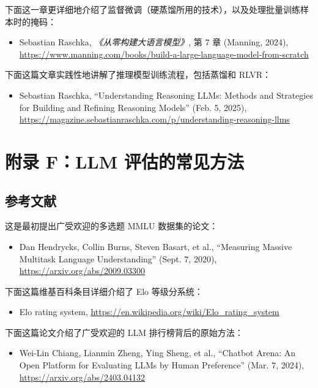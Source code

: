 下面这一章更详细地介绍了监督微调（硬蒸馏所用的技术），以及处理批量训练样本时的掩码：

\begin{itemize}
\item Sebastian Raschka, \emph{《从零构建大语言模型》}, 第 7 章 (Manning, 2024), \href{https://www.manning.com/books/build-a-large-language-model-from-scratch}{https://www.manning.com/books/build-a-large-language-model-from-scratch}
\end{itemize}

下面这篇文章实践性地讲解了推理模型训练流程，包括蒸馏和 RLVR：

\begin{itemize}
\item Sebastian Raschka, “Understanding Reasoning LLMs: Methods and Strategies for Building and Refining Reasoning Models” (Feb. 5, 2025), \href{https://magazine.sebastianraschka.com/p/understanding-reasoning-llms}{https://magazine.sebastianraschka.com/p/understanding-reasoning-llms}
\end{itemize}

\section{附录 F：LLM 评估的常见方法}

\subsection{参考文献}

这是最初提出广受欢迎的多选题 MMLU 数据集的论文：

\begin{itemize}
\item Dan Hendrycks, Collin Burns, Steven Basart, et al., “Measuring Massive Multitask Language Understanding” (Sept. 7, 2020), \href{https://arxiv.org/abs/2009.03300}{https://arxiv.org/abs/2009.03300}
\end{itemize}

下面这篇维基百科条目详细介绍了 Elo 等级分系统：

\begin{itemize}
\item Elo rating system, \href{https://en.wikipedia.org/wiki/Elo\_rating\_system}{https://en.wikipedia.org/wiki/Elo\_rating\_system}
\end{itemize}

下面这篇论文介绍了广受欢迎的 LLM 排行榜背后的原始方法：

\begin{itemize}
\item Wei-Lin Chiang, Lianmin Zheng, Ying Sheng, et al., “Chatbot Arena: An Open Platform for Evaluating LLMs by Human Preference” (Mar. 7, 2024), \href{https://arxiv.org/abs/2403.04132}{https://arxiv.org/abs/2403.04132}
\end{itemize}

